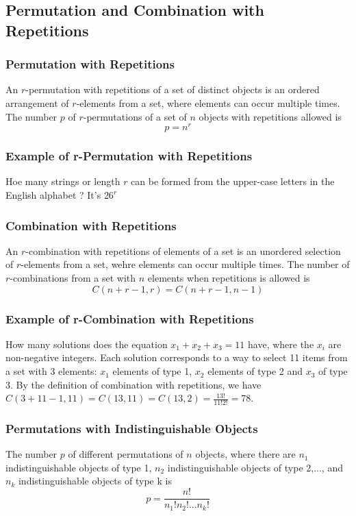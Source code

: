 \documentclass{article}
\begin{document}
\subsection{Permutation and Combination with Repetitions}
\subsubsection{Permutation with Repetitions} An $ r $-permutation with repetitions of a set of distinct objects is an ordered arrangement of $ r $-elements from a set, where elements can occur multiple times. The number $ p $ of $ r $-permutations of a set of $ n $ objects with repetitions allowed is
\begin{equation}
p = n^r
\end{equation}

\subsubsection{Example of r-Permutation with Repetitions} Hoe many strings or length $ r $ can be formed from the upper-case letters in the English alphabet ? It's $ 26^r $

\subsubsection{Combination with Repetitions} An $ r $-combination with repetitions of elements of a set is an unordered selection of $ r $-elements from a set, wehre elements can occur multiple times. The number of $ r $-combinations from a set with $ n $ elements when repetitions is allowed is
\begin{equation}
C(n + r - 1, r) = C(n + r - 1, n - 1)
\end{equation}

\subsubsection{Example of r-Combination with Repetitions} How many solutions does the equation $ x_1 + x_2 + x_3 = 11 $ have, where the $ x_i $ are non-negative integers. Each solution corresponds to a way to select 11 items from a set with 3 elements: $ x_1 $ elements of type 1, $ x_2 $ elements of type 2 and $ x_3 $ of type 3. By the definition of combination with repetitions, we have $ C(3 + 11 - 1, 11) = C(13, 11) = C(13,2) = \frac{13!}{11!2!} = 78 $. 

\subsubsection{Permutations with Indistinguishable Objects} The number $ p $ of different permutations of $ n $ objects, where there are $ n_1 $ indistinguishable objects of type 1, $ n_2 $ indistinguishable objects of type 2,..., and $ n_k $ indistinguishable objects of type k is
\begin{equation}
p = \frac{n!}{n_1!n_2!...n_k!}
\end{equation}
\end{document}
